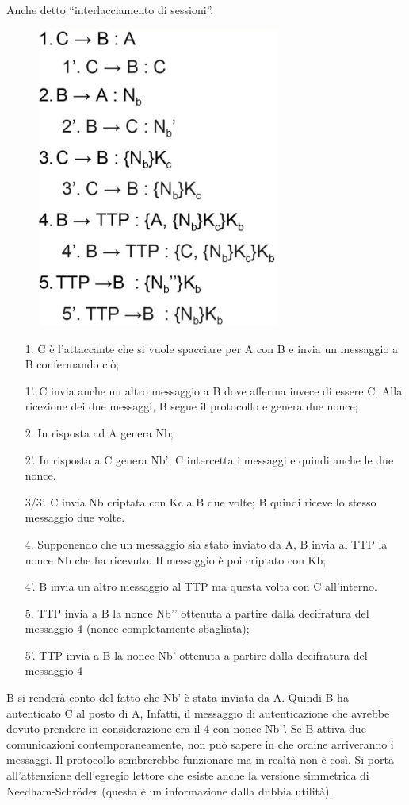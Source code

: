 Anche detto “interlacciamento di sessioni”.
\begin{figure}[H]
    \centering
    \includegraphics[width=8cm, keepaspectratio]{capitoli/crittografia/imgs/mulan2.png}
\end{figure}
\begin{enumerate}
    \item[1.] C è l’attaccante che si vuole spacciare per A con
        B e invia un messaggio a B confermando ciò;
    \item[1'.] C invia anche un altro messaggio a B dove
        afferma invece di essere C; Alla ricezione dei due
        messaggi, B segue il protocollo e genera due nonce;
    \item[2.] In risposta ad A genera Nb;
    \item[2'.] In risposta a C genera Nb’;
        C intercetta i messaggi e quindi anche le due nonce.
    \item[3/3'.] C invia Nb criptata con Kc a B due volte;
        B quindi riceve lo stesso messaggio due volte.
    \item[4.] Supponendo che un messaggio sia stato inviato
        da A, B invia al TTP la nonce Nb che ha ricevuto. Il
        messaggio è poi criptato con Kb;
    \item[4'.] B invia un altro messaggio al TTP ma questa
        volta con C all’interno.
    \item[5.] TTP invia a B la nonce Nb’’ ottenuta a partire dalla
        decifratura del messaggio 4 (nonce completamente
        sbagliata);
    \item[5'.] TTP invia a B la nonce Nb’ ottenuta a partire dalla
        decifratura del messaggio 4
\end{enumerate}

B si renderà conto del fatto che Nb’ è stata inviata da A. Quindi B ha
autenticato C al posto di A,
Infatti, il messaggio di autenticazione che avrebbe dovuto prendere in
considerazione era il 4 con
nonce Nb’’.
Se B attiva due comunicazioni contemporaneamente, non può sapere in che
ordine arriveranno i
messaggi.
Il protocollo sembrerebbe funzionare ma in realtà non è così.
Si porta all'attenzione dell'egregio lettore che esiste anche la versione
simmetrica di Needham-Schröder (questa è un informazione dalla
dubbia utilità).


